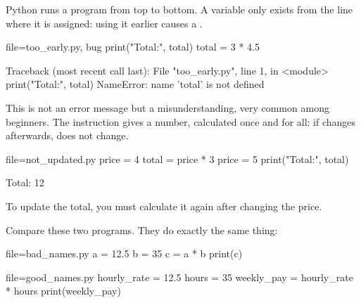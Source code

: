 
Python runs a program from top to bottom. A variable only exists from the line where it is assigned:
using it earlier causes a .
\begin{code}{file=too_early.py, bug}
print("Total:", total)
total = 3 * 4.5
\end{code}
\begin{erreur}
Traceback (most recent call last):
  File "too_early.py", line 1, in <module>
    print("Total:", total)
NameError: name 'total' is not defined
\end{erreur}

This is not an error message but a misunderstanding, very common among beginners. The instruction
 gives  a number, calculated once and for all: if  changes
afterwards,  does not change.
\begin{code}{file=not_updated.py}
price = 4
total = price * 3
price = 5
print("Total:", total)
\end{code}
\begin{sortie}
Total: 12
\end{sortie}
To update the total, you must calculate it again after changing the price.


Compare these two programs. They do exactly the same thing:

\begin{gauche}
\begin{code}{file=bad_names.py}
a = 12.5
b = 35
c = a * b
print(c)
\end{code}
\end{gauche}\begin{droite}
\begin{code}{file=good_names.py}
hourly_rate = 12.5
hours = 35
weekly_pay = hourly_rate * hours
print(weekly_pay)
\end{code}
\end{droite}

